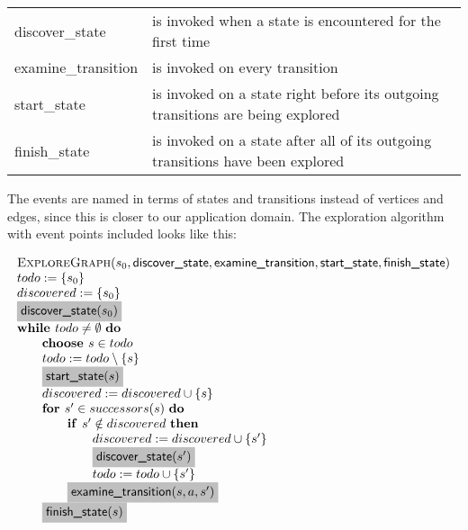 \documentclass{article}
\newcommand{\Space}{\text{\ }}
\newcommand{\If}{\text{\textbf{if }}}
\newcommand{\Do}{\text{\textbf{do }}}
\newcommand{\Then}{\text{\textbf{then }}}
\newcommand{\For}{\text{\textbf{for }}}
\newcommand{\While}{\text{\textbf{while }}}
\newcommand{\Choose}{\text{\textbf{choose }}}
\begin{document}
\begin{center}
\label{table:eventpoints}
\begin{tabular}{ |l|l| } 
\hline
\textsf{discover\_state} & is invoked when a state is encountered for the first time \\ 
\textsf{examine\_transition} & is invoked on every transition \\ 
\textsf{start\_state} & is invoked on a state right before its outgoing transitions are being explored \\ 
\textsf{finish\_state} & is invoked on a state after all of its outgoing transitions have been explored \\ 
\hline
\end{tabular}
\end{center}
The events are named in terms of states and transitions instead of vertices and edges, since this is
closer to our application domain. The exploration algorithm with event points included looks like this:

\[
\begin{tabular}{l}
\textsc{ExploreGraph}($s_0, \textsf{discover\_state}, \textsf{examine\_transition},
\textsf{start\_state}, \textsf{finish\_state}$) \\
$todo := \{ s_0 \}$ \\
$discovered := \{ s_0 \}$ \\
\colorbox{lightgray}{$\textsf{discover\_state}(s_0)$} \\
$\While todo \neq \emptyset \Space \Do$ \\
\qquad \Choose $s \in todo$ \\
\qquad $todo := todo \setminus \{s\}$ \\
\qquad \colorbox{lightgray}{$\textsf{start\_state}(s)$} \\
\qquad $discovered := discovered \cup \{s\}$ \\
\qquad $\For s' \in successors(s)  \Space \Do$ \\
\qquad \qquad $\If s' \notin discovered \Space \Then$ \\
\qquad \qquad \qquad $discovered := discovered \cup \{s' \}$ \\
\qquad \qquad \qquad \colorbox{lightgray}{$\textsf{discover\_state}(s')$} \\
\qquad \qquad \qquad $todo := todo \cup \{ s' \}$ \\
\qquad \qquad \colorbox{lightgray}{$\textsf{examine\_transition}(s, a, s')$} \\
\qquad \colorbox{lightgray}{$\textsf{finish\_state}(s)$} \\
\end{tabular}
\]
\end{document}
